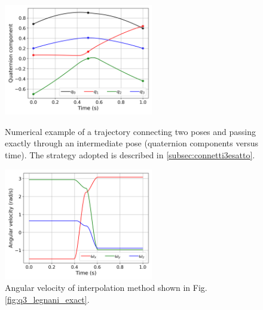 \begin{figure}[tbp]
    \begin{minipage}[t]{0.49\textwidth}
        \centering
        \includegraphics[width=6.5cm]{figures/legnani_exact_compo.png}
        \caption{Numerical example of a trajectory connecting two poses and passing exactly through an intermediate pose (quaternion components versus time). The strategy adopted is described in \ref{subsec:connetti3esatto}.}
        \label{fig:q3_legnani_exact}
    \end{minipage}
    \hfill
    \begin{minipage}[t]{0.49\textwidth}
        \centering
        \includegraphics[width=6.5cm]{figures/legnani_exact_vel.png}
        \caption{Angular velocity of interpolation method shown in Fig. \ref{fig:q3_legnani_exact}.}
        \label{fig:q3_legnani_exact_velocity}
    \end{minipage}
\end{figure}


